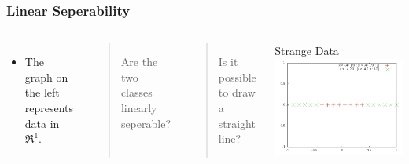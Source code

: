 \documentclass{beamer}
\begin{document}
\begin{frame}
\frametitle{Linear Seperability}
\begin{columns}[c]


\begin{itemize}
\item The graph on the left represents data in $\Re^1$.
\end{itemize}

\begin{quote}
Are the two classes linearly seperable?
\end{quote}

\begin{quote}
Is it possible to draw a straight line?
\end{quote}


\begin{block}{Strange Data}
\includegraphics[scale=.35]{../figures/example_0.png}
\end{block}

\end{columns}

\end{frame}

\end{document}
